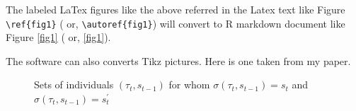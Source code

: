 \documentclass[12pt,svgnames]{article}
\begin{document}
The labeled LaTex figures like the above referred in the Latex text like Figure \verb&\ref{fig1}& ( or, \verb&\autoref{fig1}&) will convert to R markdown document like Figure \ref{fig1} ( or, \autoref{fig1}).

The software can also converts Tikz pictures.  Here is one taken from my \cite{Raut_2017a} paper.

\begin{figure}[tbp]
\caption{Sets of individuals $(\tau_t,s_{t-1})$ for whom $\sigma(\tau_t,s_{t-1})=s_t$ and $\sigma(\tau _t,s_{t-1})=s^{\prime }_t$}
\label{fig2}
\end{figure}
\end{document}
